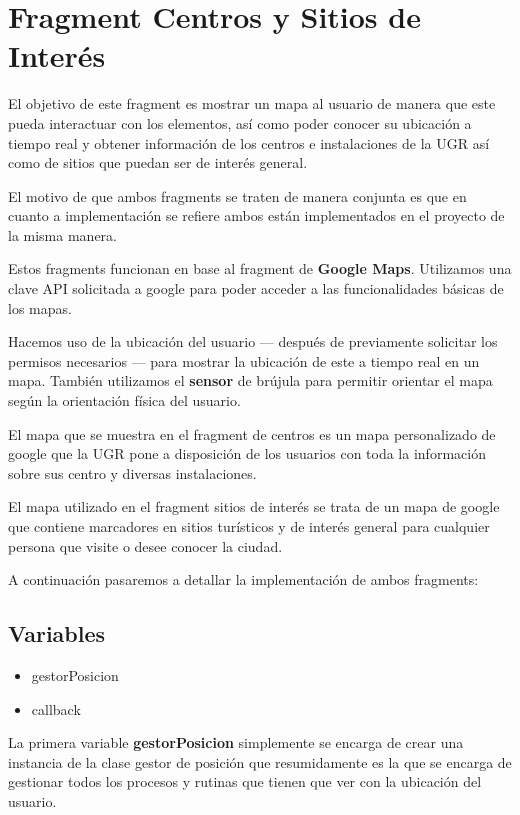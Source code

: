 \section{Fragment Centros y Sitios de Interés}
El objetivo de este fragment es mostrar un mapa al usuario de manera que este pueda interactuar con los elementos, así como poder conocer su ubicación a tiempo real y obtener información de los centros e instalaciones de la UGR así como de sitios que puedan ser de interés general.

El motivo de que ambos fragments se traten de manera conjunta es que en cuanto a implementación se refiere ambos están implementados en el proyecto de la misma manera.

Estos fragments funcionan en base al fragment de \textbf{Google Maps}. Utilizamos una clave API solicitada a google para poder acceder a las funcionalidades básicas de los mapas.

Hacemos uso de la ubicación del usuario --- después de previamente solicitar los permisos necesarios --- para mostrar la ubicación de este a tiempo real en un mapa. También utilizamos el \textbf{sensor} de brújula para permitir orientar el mapa según la orientación física del usuario.

El mapa que se muestra en el fragment de centros es un mapa personalizado de google que la UGR pone a disposición de los usuarios con toda la información sobre sus centro y diversas instalaciones.

El mapa utilizado en el fragment sitios de interés se trata de un mapa de google que contiene marcadores en sitios turísticos y de interés general para cualquier persona que visite o desee conocer la ciudad.

A continuación pasaremos a detallar la implementación de ambos fragments:

\subsection{Variables}

\begin{itemize}
	\item gestorPosicion
	\item callback
\end{itemize}

La primera variable \textbf{gestorPosicion} simplemente se encarga de crear una instancia de la clase gestor de posición que resumidamente es la que se encarga de gestionar todos los procesos y rutinas que tienen que ver con la ubicación del usuario.


